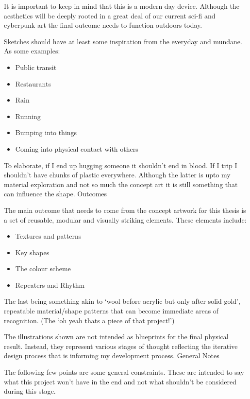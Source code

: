 It is important to keep in mind that this is a modern day device. Although the aesthetics will be deeply rooted in a great deal of our current sci-fi and cyberpunk art the final outcome needs to function outdoors today.

Sketches should have at least some inspiration from the everyday and mundane. As some examples:

\begin{itemize}
  \item Public transit
  \item Restaurants
  \item Rain
  \item Running
  \item Bumping into things
  \item Coming into physical contact with others
\end{itemize}

To elaborate, if I end up hugging someone it shouldn’t end in blood. If I trip I shouldn’t have chunks of plastic everywhere. Although the latter is upto my material exploration and not so much the concept art it is still something that can influence the shape.
Outcomes

The main outcome that needs to come from the concept artwork for this thesis is a set of reusable, modular and visually striking elements. These elements include:

\begin{itemize}
  \item Textures and patterns
  \item Key shapes
  \item The colour scheme
  \item Repeaters and Rhythm
\end{itemize}

The last being something akin to `wool before acrylic but only after solid gold', repeatable material/shape patterns that can become immediate areas of recognition. (The `oh yeah thats a piece of that project!')

The illustrations shown are not intended as blueprints for the final physical result. Instead, they represent various stages of thought reflecting the iterative design process that is informing my development process.
General Notes

The following few points are some general constraints. These are intended to say what this project won’t have in the end and not what shouldn’t be considered during this stage.


